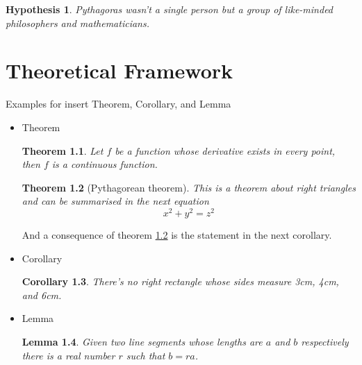 \documentclass[a4paper, 12pt]{report}
\newtheorem{theorem}{Theorem}
\newtheorem{corollary}[theorem]{Corollary}
\newtheorem{lemma}[theorem]{Lemma}
\newtheorem{subhyp}{Hypothesis}
\begin{document}
    \begin{subhyp}
        \emph{Pythagoras} wasn't a single person but a group of like-minded philosophers and mathematicians.
    \end{subhyp}
    
\pagebreak \newpage

\chapter{Theoretical Framework} \label{sec:theory}

        Examples for insert Theorem, Corollary, and Lemma
        \begin{itemize}
            \item Theorem
                \begin{theorem}
                    Let \(f\) be a function whose derivative exists in every point, then \(f\) is a continuous function.
                \end{theorem}

                \begin{theorem}[Pythagorean theorem]
                    \label{pythagorean}
                    This is a theorem about right triangles and can be summarised in the next equation 
                    \[ x^2 + y^2 = z^2 \]
                \end{theorem}

            And a consequence of theorem \ref{pythagorean} is the statement in the next corollary.

            \item Corollary
                \begin{corollary}
                    There's no right rectangle whose sides measure 3cm, 4cm, and 6cm.
                \end{corollary}

            \item Lemma
            
                \begin{lemma}
                    Given two line segments whose lengths are \(a\) and \(b\) respectively there is a real number \(r\) such that \(b=ra\).
                \end{lemma}
        \end{itemize}    

\pagebreak \newpage

\end{document}
